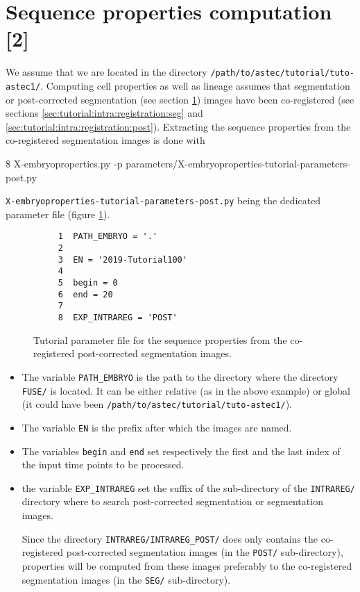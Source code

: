 \section{Sequence properties computation [2]}
\label{sec:tutorial:properties:post}

We assume that we are located in the directory
\texttt{/path/to/astec/tutorial/tuto-astec1/}.
Computing cell properties as well as lineage assumes that
 segmentation or post-corrected segmentation (see section
\ref{sec:tutorial:properties:post}) images have been
co-registered (see sections \ref{sec:tutorial:intra:registration:seg}
and \ref{sec:tutorial:intra:registration:post}). 
Extracting the sequence properties from the co-registered segmentation
images is
done with
\begin{code}{0.8}
  \$ X-embryoproperties.py -p parameters/X-embryoproperties-tutorial-parameters-post.py
\end{code}
\texttt{X-embryoproperties-tutorial-parameters-post.py} being the
dedicated parameter file  (figure \ref{fig:tutorial:parameter:properties:post}).

\begin{figure}
\begin{framed}
\begin{verbatim}
     1	PATH_EMBRYO = '.'
     2	
     3	EN = '2019-Tutorial100'
     4	
     5	begin = 0
     6	end = 20
     7	
     8	EXP_INTRAREG = 'POST'
\end{verbatim}
\end{framed}
\caption{\label{fig:tutorial:parameter:properties:post} Tutorial
  parameter file for the sequence properties from the co-registered
  post-corrected segmentation images.}
\end{figure}

\begin{itemize}
  \itemsep -1ex
  \item The variable \texttt{PATH\_EMBRYO} is the path to the directory where
    the directory \texttt{FUSE/} is located. It can be either relative (as in the
    above example) or
    global (it could have been \texttt{/path/to/astec/tutorial/tuto-astec1/}).
  \item The variable \texttt{EN} is the prefix after which the  images
    are named. 
  \item The variables \texttt{begin} and \texttt{end} set respectively the
    first and the last index of the input time points to be processed.
  \item  the variable \texttt{EXP\_INTRAREG} set the suffix of the
    sub-directory of the \texttt{INTRAREG/} directory where to search
    post-corrected segmentation or segmentation images.

    Since the directory \texttt{INTRAREG/INTRAREG\_POST/} does only
    contains the co-registered post-corrected segmentation images (in the
    \texttt{POST/} sub-directory), properties will be computed from
    these images preferably to the co-registered segmentation images (in the
    \texttt{SEG/} sub-directory).
\end{itemize}

